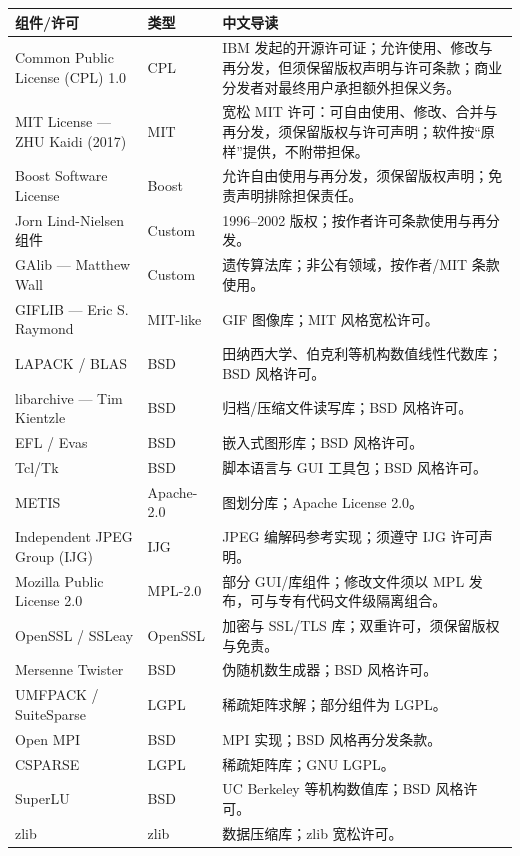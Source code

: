 \begin{longtable}{@{}p{}p{}p{}@{}}
\toprule
\textbf{组件/许可} & \textbf{类型} & \textbf{中文导读} \\
\midrule
\endhead
Common Public License (CPL) 1.0 & CPL & IBM 发起的开源许可证；允许使用、修改与再分发，但须保留版权声明与许可条款；商业分发者对最终用户承担额外担保义务。 \\
MIT License — ZHU Kaidi (2017) & MIT & 宽松 MIT 许可：可自由使用、修改、合并与再分发，须保留版权与许可声明；软件按“原样”提供，不附带担保。 \\
Boost Software License & Boost & 允许自由使用与再分发，须保留版权声明；免责声明排除担保责任。 \\
Jorn Lind-Nielsen 组件 & Custom & 1996–2002 版权；按作者许可条款使用与再分发。 \\
GAlib — Matthew Wall & Custom & 遗传算法库；非公有领域，按作者/MIT 条款使用。 \\
GIFLIB — Eric S. Raymond & MIT-like & GIF 图像库；MIT 风格宽松许可。 \\
LAPACK / BLAS & BSD & 田纳西大学、伯克利等机构数值线性代数库；BSD 风格许可。 \\
libarchive — Tim Kientzle & BSD & 归档/压缩文件读写库；BSD 风格许可。 \\
EFL / Evas & BSD & 嵌入式图形库；BSD 风格许可。 \\
Tcl/Tk & BSD & 脚本语言与 GUI 工具包；BSD 风格许可。 \\
METIS & Apache-2.0 & 图划分库；Apache License 2.0。 \\
Independent JPEG Group (IJG) & IJG & JPEG 编解码参考实现；须遵守 IJG 许可声明。 \\
Mozilla Public License 2.0 & MPL-2.0 & 部分 GUI/库组件；修改文件须以 MPL 发布，可与专有代码文件级隔离组合。 \\
OpenSSL / SSLeay & OpenSSL & 加密与 SSL/TLS 库；双重许可，须保留版权与免责。 \\
Mersenne Twister & BSD & 伪随机数生成器；BSD 风格许可。 \\
UMFPACK / SuiteSparse & LGPL & 稀疏矩阵求解；部分组件为 LGPL。 \\
Open MPI & BSD & MPI 实现；BSD 风格再分发条款。 \\
CSPARSE & LGPL & 稀疏矩阵库；GNU LGPL。 \\
SuperLU & BSD & UC Berkeley 等机构数值库；BSD 风格许可。 \\
zlib & zlib & 数据压缩库；zlib 宽松许可。 \\
\bottomrule
\end{longtable}

